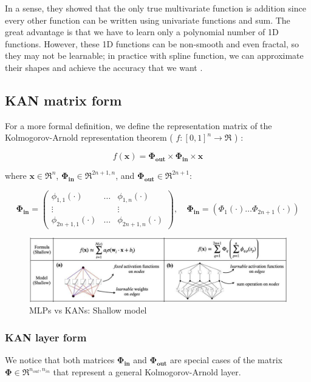 In a sense, they showed that the only true multivariate function is addition since every other function can be written using univariate functions and sum. The great advantage is that we have to learn only a polynomial number of 1D functions. However, these 1D functions can be non-smooth and even fractal, so they may not be learnable; in practice with spline function, we can approximate their shapes and achieve the accuracy that we want \cite{KAN}.

\subsection{KAN matrix form}
\label{sec:ma}
For a more formal definition, we define the representation matrix of the Kolmogorov-Arnold representation theorem ( $f: [0,1]^n \rightarrow \Re$ ) \cite{KAN}:

$$f(\textbf{x}) = \boldsymbol{\Phi_{out}} \times \boldsymbol{\Phi_{in} }\times \textbf{x}$$

where $\textbf{x} \in \Re^n$, $\boldsymbol{\Phi_{in}} \in \Re^{2n+1,n}$, and $\boldsymbol{\Phi_{out}} \in \Re^{2n+1}$:

\[
\boldsymbol{\Phi_{in}} = 
\begin{pmatrix}
\phi_{1,1}(\cdot) & \dots & \phi_{1,n}(\cdot) \\
\vdots &   & \vdots \\
\phi_{2n+1,1}(\cdot) & \dots & \phi_{2n+1,n}(\cdot)
\end{pmatrix},
\quad \boldsymbol{\Phi_{in}} = (\Phi_{1}(\cdot) \dots \Phi_{2n+1}(\cdot))
\]

\begin{figure}[H]
    \centering
    \includegraphics[width=0.8\linewidth]{Images/A.JPG}
    \caption{ MLPs vs KANs: Shallow model}
\end{figure}

\subsubsection{KAN layer form}
We notice that both matrices $\boldsymbol{\Phi_{in}}$ and $\boldsymbol{\Phi_{out}}$ are special cases of the matrix $\boldsymbol{\Phi} \in \Re^{n_{out},n_{in}}$ that represent a general Kolmogorov-Arnold layer. 

